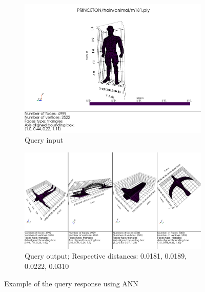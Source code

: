 \begin{figure}[H]
    \begin{subfigure}[b]{0.3\textwidth}
        \includegraphics[width=\textwidth]{assets/queries/human/input.png}
        \caption{Query input}
        \label{fig:query-input-ann-3}
    \end{subfigure}
    \hfill
    \begin{subfigure}[b]{0.65\textwidth}
        \includegraphics[width=\textwidth]{assets/queries/human_ann/output.png}
        \caption{Query output; Respective distances: 0.0181, 0.0189, 0.0222, 0.0310}
        \label{fig:query-output-ann-3}
    \end{subfigure}
    \hfill
    
    \caption{Example of the query response using ANN}
    \label{fig:query-response-example-ann}
\end{figure}

